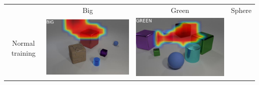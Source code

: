 \begin{table}\centering
{}
\begin{tabular}{@{}cccc@{}}\toprule
& Big & Green & Sphere \\
Normal training &
    \begin{minipage}{.2\textwidth}
      \includegraphics[width=\linewidth]{figures/CLEVR_activations/big_normal01.jpg}
    \end{minipage}
    &
    \begin{minipage}{.2\textwidth}
      \includegraphics[width=\linewidth]{figures/CLEVR_activations/green_normal1.jpg}
    \end{minipage}
    &
    \begin{minipage}{.2\textwidth}

\end{minipage}
\end{tabular}
\end{table}
